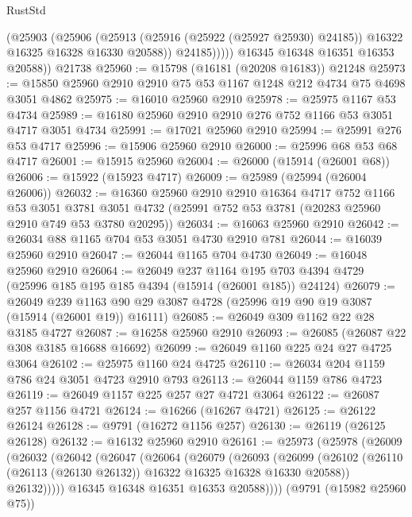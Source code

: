 \begin{lexlean}{RustStd}
\begin{coremodule}
                (@25903
                  (@25906
                    (@25913
                      (@25916 (@25922 (@25927 @25930) @24185))
                      @16322
                      @16325
                      @16328
                      @16330
                      @20588))
                  @24185)))))
        @16345
        @16348
        @16351
        @16353
        @20588))
    @21738
@25960 := @15798 (@16181 (@20208 @16183)) @21248
@25973 := @15850 @25960 @2910 @2910 @75 @53 @1167 @1248 @212 @4734 @75 @4698 @3051 @4862
@25975 := @16010 @25960 @2910
@25978 := @25975 @1167 @53 @4734
@25989 := @16180 @25960 @2910 @2910 @276 @752 @1166 @53 @3051 @4717 @3051 @4734
@25991 := @17021 @25960 @2910
@25994 := @25991 @276 @53 @4717
@25996 := @15906 @25960 @2910
@26000 := @25996 @68 @53 @68 @4717
@26001 := @15915 @25960
@26004 := @26000 (@15914 (@26001 @68))
@26006 := @15922 (@15923 @4717)
@26009 := @25989 (@25994 (@26004 @26006))
@26032 := @16360
    @25960
    @2910
    @2910
    @16364
    @4717
    @752
    @1166
    @53
    @3051
    @3781
    @3051
    @4732
    (@25991 @752 @53 @3781 (@20283 @25960 @2910 @749 @53 @3780 @20295))
@26034 := @16063 @25960 @2910
@26042 := @26034 @88 @1165 @704 @53 @3051 @4730 @2910 @781
@26044 := @16039 @25960 @2910
@26047 := @26044 @1165 @704 @4730
@26049 := @16048 @25960 @2910
@26064 := @26049
    @237
    @1164
    @195
    @703
    @4394
    @4729
    (@25996 @185 @195 @185 @4394 (@15914 (@26001 @185)) @24124)
@26079 := @26049
    @239
    @1163
    @90
    @29
    @3087
    @4728
    (@25996 @19 @90 @19 @3087 (@15914 (@26001 @19)) @16111)
@26085 := @26049 @309 @1162 @22 @28 @3185 @4727
@26087 := @16258 @25960 @2910
@26093 := @26085 (@26087 @22 @308 @3185 @16688 @16692)
@26099 := @26049 @1160 @225 @24 @27 @4725 @3064
@26102 := @25975 @1160 @24 @4725
@26110 := @26034 @204 @1159 @786 @24 @3051 @4723 @2910 @793
@26113 := @26044 @1159 @786 @4723
@26119 := @26049 @1157 @225 @257 @27 @4721 @3064
@26122 := @26087 @257 @1156 @4721
@26124 := @16266 (@16267 @4721)
@26125 := @26122 @26124
@26128 := @9791 (@16272 @1156 @257)
@26130 := @26119 (@26125 @26128)
@26132 := @16132 @25960 @2910
@26161 := @25973
    (@25978
      (@26009
        (@26032
          (@26042
            (@26047
              (@26064
                (@26079
                  (@26093
                    (@26099
                      (@26102 (@26110 (@26113 (@26130 @26132)) @16322 @16325 @16328 @16330 @20588))
                      @26132)))))
            @16345
            @16348
            @16351
            @16353
            @20588))))
    (@9791 (@15982 @25960 @75))

\end{coremodule}
\end{lexlean}
